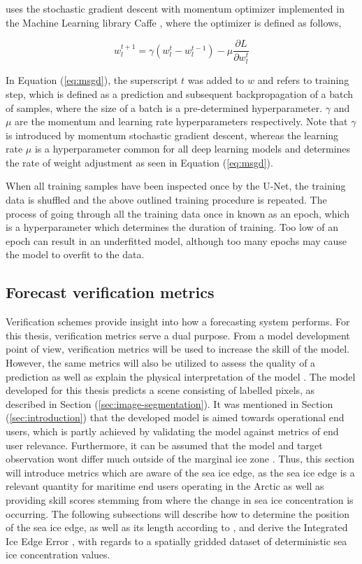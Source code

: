 \documentclass[../main/thesis.tex]{subfiles}
\begin{document}
\citet{Ronneberger2015} uses the stochastic gradient descent with momentum optimizer implemented in the Machine Learning library Caffe \citep{Jia2014}, where the optimizer is defined as follows,

\begin{equation}
    \label{eq:msgd}
    w_l^{t+1} = \gamma(w_l^t - w_l^{t-1}) - \mu\frac{\partial L}{\partial w_l^t}
\end{equation}

In Equation (\ref{eq:msgd}), the superscript $t$ was added to $w$ and refers to training step, which is defined as a prediction and subsequent backpropagation of a batch of samples, where the size of a batch is a pre-determined hyperparameter. $\gamma$ and $\mu$ are the momentum and learning rate hyperparameters respectively. Note that $\gamma$ is introduced by momentum stochastic gradient descent, whereas the learning rate $\mu$ is a hyperparameter common for all deep learning models and determines the rate of weight adjustment as seen in Equation (\ref{eq:msgd}).

When all training samples have been inspected once by the U-Net, the training data is shuffled and the above outlined training procedure is repeated. The process of going through all the training data once in known as an epoch, which is a hyperparameter which determines the duration of training. Too low of an epoch can result in an underfitted model, although too many epochs may cause the model to overfit to the data. 

\subsection{Forecast verification metrics}
Verification schemes provide insight into how a forecasting system performs. For this thesis, verification metrics serve a dual purpose. From a model development point of view, verification metrics will be used to increase the skill of the model. However, the same metrics will also be utilized to assess the quality of a prediction as well as explain the physical interpretation of the model \citep{Casati2008}. The model developed for this thesis predicts a scene consisting of labelled pixels, as described in Section (\ref{sec:image-segmentation}). It was mentioned in Section (\ref{sec:introduction}) that the developed model is aimed towards operational end users, which is partly achieved by validating the model against metrics of end user relevance. Furthermore, it can be assumed that the model and target observation wont differ much outside of the marginal ice zone \citep{Fritzner2020}. Thus, this section will introduce metrics which are aware of the sea ice edge, as the sea ice edge is a relevant quantity for maritime end users operating in the Arctic \citep{Melsom2019} as well as providing skill scores stemming from where the change in sea ice concentration is occurring. The following subsections will describe how to determine the position of the sea ice edge, as well as its length according to \citet{Melsom2019}, and derive the Integrated Ice Edge Error \citep{Goessling2016}, with regards to a spatially gridded dataset of deterministic sea ice concentration values.
\end{document}

